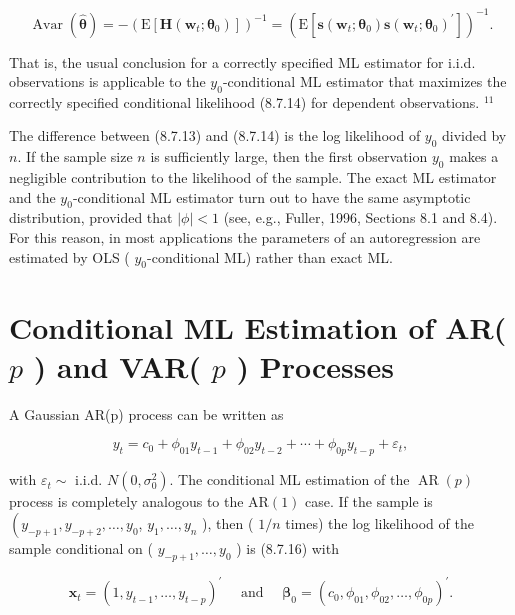 \documentclass[10pt]{article}
\begin{document}
\begin{equation*}
\operatorname{Avar}(\hat{\boldsymbol{\theta}})=-\left(\mathrm{E}\left[\mathbf{H}\left(\mathbf{w}_{t} ; \boldsymbol{\theta}_{0}\right)\right]\right)^{-1}=\left(\mathrm{E}\left[\mathbf{s}\left(\mathbf{w}_{t} ; \boldsymbol{\theta}_{0}\right) \mathbf{s}\left(\mathbf{w}_{t} ; \boldsymbol{\theta}_{0}\right)^{\prime}\right]\right)^{-1} . \tag{8.7.19}
\end{equation*}


That is, the usual conclusion for a correctly specified ML estimator for i.i.d. observations is applicable to the $y_{0}$-conditional ML estimator that maximizes the correctly specified conditional likelihood (8.7.14) for dependent observations. ${ }^{11}$

The difference between (8.7.13) and (8.7.14) is the log likelihood of $y_{0}$ divided by $n$. If the sample size $n$ is sufficiently large, then the first observation $y_{0}$ makes a negligible contribution to the likelihood of the sample. The exact ML estimator and the $y_{0}$-conditional ML estimator turn out to have the same asymptotic distribution, provided that $|\phi|<1$ (see, e.g., Fuller, 1996, Sections 8.1 and 8.4). For this reason, in most applications the parameters of an autoregression are estimated by OLS ( $y_{0}$-conditional ML) rather than exact ML.

\section*{Conditional ML Estimation of AR( $p$ ) and VAR( $p$ ) Processes}
A Gaussian AR(p) process can be written as


\begin{equation*}
y_{t}=c_{0}+\phi_{01} y_{t-1}+\phi_{02} y_{t-2}+\cdots+\phi_{0 p} y_{t-p}+\varepsilon_{t}, \tag{8.7.20}
\end{equation*}


with $\varepsilon_{t} \sim$ i.i.d. $N\left(0, \sigma_{0}^{2}\right)$. The conditional ML estimation of the $\operatorname{AR}(p)$ process is completely analogous to the $\mathrm{AR}(1)$ case. If the sample is $\left(y_{-p+1}, y_{-p+2}, \ldots, y_{0}\right.$, $y_{1}, \ldots, y_{n}$ ), then ( $1 / n$ times) the log likelihood of the sample conditional on ( $y_{-p+1}, \ldots, y_{0}$ ) is (8.7.16) with

$$
\mathbf{x}_{t}=\left(1, y_{t-1}, \ldots, y_{t-p}\right)^{\prime} \quad \text { and } \quad \boldsymbol{\beta}_{0}=\left(c_{0}, \phi_{01}, \phi_{02}, \ldots, \phi_{0 p}\right)^{\prime} .
$$
\end{document}
